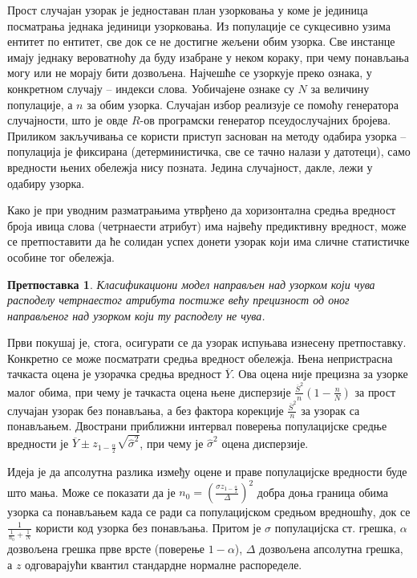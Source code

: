 \documentclass[a4paper]{article}
\newtheorem{hipoteza}{Претпоставка}
\begin{document}
Прост случајан узорак је једноставан план узорковања у коме је јединица посматрања једнака јединици узорковања.\cite{prez2} Из популације се сукцесивно узима ентитет по ентитет, све док се не достигне жељени обим узорка. Све инстанце имају једнаку вероватноћу да буду изабране у неком кораку, при чему понављања могу или не морају бити дозвољена. Најчешће се узоркује преко ознака, у конкретном случају -- индекси слова. Уобичајене ознаке су $N$ за величину популације, а $n$ за обим узорка. Случајан избор реализује се помоћу генератора случајности, што је овде $R$-ов програмски генератор псеудослучајних бројева. Приликом закључивања се користи приступ заснован на методу одабира узорка -- популација је фиксирана (детерминистичка, све се тачно налази у датотеци), само вредности њених обележја нису позната. Једина случајност, дакле, лежи у одабиру узорка.

Како је при уводним разматрањима утврђено да хоризонтална средња вредност броја ивица слова (четрнаести атрибут) има највећу предиктивну вредност, може се претпоставити да ће солидан успех донети узорак који има сличне статистичке особине тог обележја.

\begin{hipoteza}
Класификациони модел направљен над узорком који чува расподелу четрнаестог атрибута постиже већу прецизност од оног направљеног над узорком који ту расподелу не чува.
\end{hipoteza}

Први покушај је, стога, осигурати се да узорак испуњава изнесену претпоставку. Конкретно се може посматрати средња вредност обележја. Њена непристрасна тачкаста оцена је узорачка средња вредност $\overline{Y}$. Ова оцена није прецизна за узорке малог обима, при чему је тачкаста оцена њене дисперзије $\frac{\overline{S}^2}{n}(1 - \frac{n}{N})$ за прост случајан узорак без понављања, а без фактора корекције $\frac{\overline{S}^2}{n}$ за узорак са понављањем. Двострани приближни интервал поверења популацијске средње вредности је $\overline{Y} \pm z_{1 - \frac{\alpha}{2}}\sqrt{\hat{\sigma}^2}$, при чему је $\hat{\sigma}^2$ оцена дисперзије.

Идеја је да апсолутна разлика између оцене и праве популацијске вредности буде што мања. Може се показати да је $n_0 = (\frac{\sigma z_{1-\frac{\alpha}{2}}}{\Delta})^2$ добра доња граница обима узорка са понављањем када се ради са популацијском средњом вредношћу, док се $\frac{1}{\frac{1}{n_0} + \frac{1}{N}}$ користи код узорка без понављања. Притом је $\sigma$ популацијска ст. грешка, $\alpha$ дозвољена грешка прве врсте (поверење $1 - \alpha$), $\Delta$ дозвољена апсолутна грешка, а $z$ одговарајући квантил стандардне нормалне распоределе.
\end{document}
